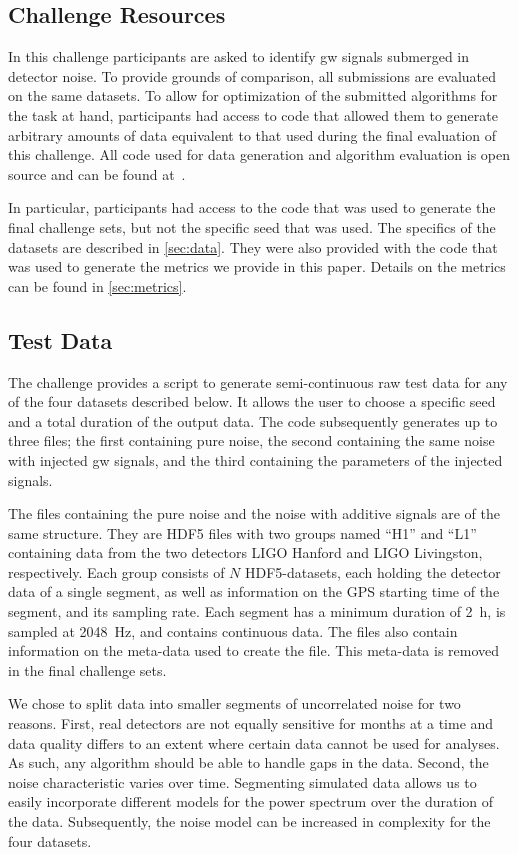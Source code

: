 \subsection{Challenge Resources}
In this challenge participants are asked to identify \acrshort{gw} signals submerged in detector noise. To provide grounds of comparison, all submissions are evaluated on the same datasets. To allow for optimization of the submitted algorithms for the task at hand, participants had access to code that allowed them to generate arbitrary amounts of data equivalent to that used during the final evaluation of this challenge. All code used for data generation and algorithm evaluation is open source and can be found at~\cite{github}.

In particular, participants had access to the code that was used to generate the final challenge sets, but not the specific seed that was used. The specifics of the datasets are described in \autoref{sec:data}. They were also provided with the code that was used to generate the metrics we provide in this paper. Details on the metrics can be found in \autoref{sec:metrics}.

\subsection{Test Data}\label{sec:data}
The challenge provides a script to generate semi-continuous raw test data for any of the four datasets described below. It allows the user to choose a specific seed and a total duration of the output data. The code subsequently generates up to three files; the first containing pure noise, the second containing the same noise with injected \acrshort{gw} signals, and the third containing the parameters of the injected signals.

The files containing the pure noise and the noise with additive signals are of the same structure. They are HDF5 \cite{hdf5} files with two groups named ``H1'' and ``L1'' containing data from the two detectors LIGO Hanford and LIGO Livingston, respectively. Each group consists of $N$ HDF5-datasets, each holding the detector data of a single segment, as well as information on the GPS starting time of the segment, and its sampling rate. Each segment has a minimum duration of \SI{2}{\hour}, is sampled at \SI{2048}{\hertz}, and contains continuous data. The files also contain information on the meta-data used to create the file. This meta-data is removed in the final challenge sets.

We chose to split data into smaller segments of uncorrelated noise for two reasons. First, real detectors are not equally sensitive for months at a time and data quality differs to an extent where certain data cannot be used for analyses. As such, any algorithm should be able to handle gaps in the data. Second, the noise characteristic varies over time. Segmenting simulated data allows us to easily incorporate different models for the power spectrum over the duration of the data. Subsequently, the noise model can be increased in complexity for the four datasets.

